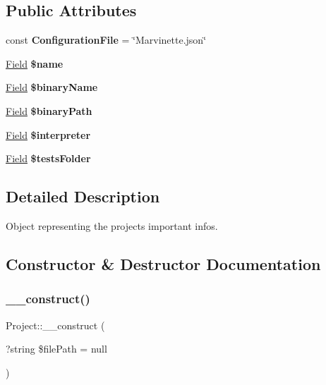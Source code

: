 \subsection*{Public Attributes}
\begin{DoxyCompactItemize}
\item 
\mbox{\label{classProject_af24a2186c2669ac5acfa29fbc71c7bd2}} 
const {\bfseries Configuration\+File} = \char`\"{}Marvinette.\+json\char`\"{}
\item 
\mbox{\label{classProject_abf56709b7a46b62d9d7febddad179197}} 
\hyperlink{classField}{Field} {\bfseries \$name}
\item 
\mbox{\label{classProject_a3b8e966f7165ec5e6df102679eab5bbc}} 
\hyperlink{classField}{Field} {\bfseries \$binary\+Name}
\item 
\mbox{\label{classProject_a010db9bfd82fd07c825f26910b5b1953}} 
\hyperlink{classField}{Field} {\bfseries \$binary\+Path}
\item 
\mbox{\label{classProject_a410292d6310de22b8404b5128892b3cc}} 
\hyperlink{classField}{Field} {\bfseries \$interpreter}
\item 
\mbox{\label{classProject_a31ff999c516ebcbe9103b16eeb73bf5f}} 
\hyperlink{classField}{Field} {\bfseries \$tests\+Folder}
\end{DoxyCompactItemize}


\subsection{Detailed Description}
Object representing the project\textquotesingle{}s important infos. 

\subsection{Constructor \& Destructor Documentation}
\mbox{\label{classProject_a8cdc8d54b71a7084cd0ed8f30fbec1bc}} 
\subsubsection{\texorpdfstring{\+\_\+\+\_\+construct()}{\_\_construct()}}
{\footnotesize\ttfamily Project\+::\+\_\+\+\_\+construct (\begin{DoxyParamCaption}\item[{?string}]{\$file\+Path = {\ttfamily null} }\end{DoxyParamCaption})}


